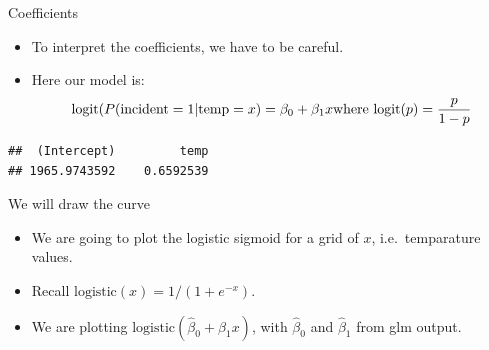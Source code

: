 \documentclass[
  ignorenonframetext,
]{beamer}
\newenvironment{Shaded}{\begin{snugshade}}{\end{snugshade}}
\newcommand{\AttributeTok}[1]{\textcolor[rgb]{0.77,0.63,0.00}{#1}}
\newcommand{\CommentTok}[1]{\textcolor[rgb]{0.56,0.35,0.01}{\textit{#1}}}
\newcommand{\DecValTok}[1]{\textcolor[rgb]{0.00,0.00,0.81}{#1}}
\newcommand{\FunctionTok}[1]{\textcolor[rgb]{0.00,0.00,0.00}{#1}}
\newcommand{\NormalTok}[1]{#1}
\newcommand{\OtherTok}[1]{\textcolor[rgb]{0.56,0.35,0.01}{#1}}
\newcommand{\SpecialCharTok}[1]{\textcolor[rgb]{0.00,0.00,0.00}{#1}}
\newcommand{\StringTok}[1]{\textcolor[rgb]{0.31,0.60,0.02}{#1}}
\begin{document}
\begin{frame}[fragile]{Coefficients}
\protect\hypertarget{coefficients}{}
\begin{itemize}
\item
  To interpret the coefficients, we have to be careful.
\item
  Here our model is: \[
  \text{logit}(P(\text{incident} = 1 | \text{temp} = x) = \beta_0 + \beta_1 x \\
  \text{where } \text{logit}(p) = \frac{p}{1-p}
  \]
\end{itemize}

\begin{verbatim}
##  (Intercept)         temp 
## 1965.9743592    0.6592539
\end{verbatim}
\end{frame}

\begin{frame}[fragile]{We will draw the curve}
\protect\hypertarget{we-will-draw-the-curve}{}
\begin{itemize}
\item
  We are going to plot the logistic sigmoid for a grid of \(x\),
  i.e.~temparature values.
\item
  Recall \(\text{logistic}(x) = 1/(1 + e^{-x})\).
\item
  We are plotting \(\text{logistic}(\hat{\beta}_0 + \hat{\beta}_1 x)\),
  with \(\hat{\beta}_0\) and \(\hat{\beta}_1\) from glm output.
\end{itemize}

\begin{Shaded}
\end{Shaded}
\end{frame}
\end{document}
